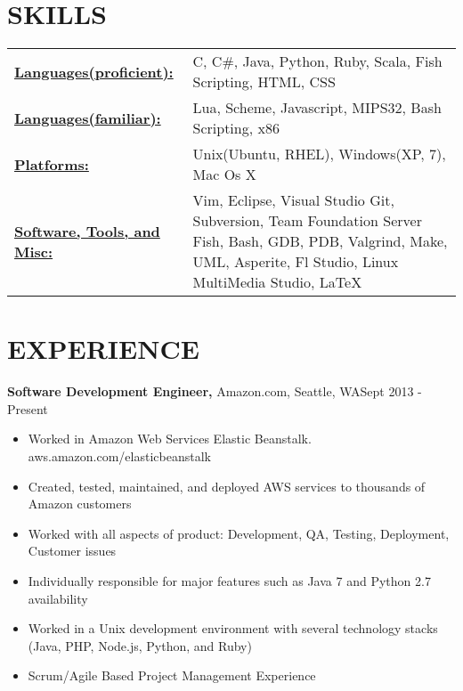 \documentclass{res}
\begin{document}
 
\address{2226 Elliott Ave Apt 113, Seattle, WA 98121 (928) 284-5522 Charliec364@gmail.com }


\begin{resume}

\section{SKILLS}
   \begin{tabular}{l p{3in}}
     \underline{\bf Languages(proficient):} & C, C\#, Java, Python, Ruby, Scala, Fish Scripting, HTML, CSS \\
     \underline{\bf Languages(familiar):} & Lua, Scheme, Javascript, MIPS32, Bash Scripting, x86 \\
     \underline{\bf Platforms:} & Unix(Ubuntu, RHEL), Windows(XP, 7), Mac Os X \\
     \underline{\bf Software, Tools, and Misc:} &  Vim, Eclipse, Visual Studio
                        Git, Subversion, Team Foundation Server
                        Fish, Bash, GDB, PDB, Valgrind, Make, 
                        UML, Asperite, Fl Studio, Linux MultiMedia Studio, \LaTeX\
 \end{tabular}
 
\section{EXPERIENCE}
  {\bf Software Development Engineer,} Amazon.com, Seattle, WA\hfill Sept 2013 - Present
  \begin{itemize} \itemsep -2pt  %
    \item Worked in Amazon Web Services Elastic Beanstalk. aws.amazon.com/elasticbeanstalk
    \item Created, tested, maintained, and deployed AWS services to thousands of Amazon customers
    \item Worked with all aspects of product: Development, QA, Testing, Deployment, Customer issues
    \item Individually responsible for major features such as Java 7 and Python 2.7 availability
    \item Worked in a Unix development environment with several technology stacks (Java,  PHP, Node.js, Python, and Ruby)
    \item Scrum/Agile Based Project Management Experience
  \end{itemize}


\end{resume}
\end{document}
